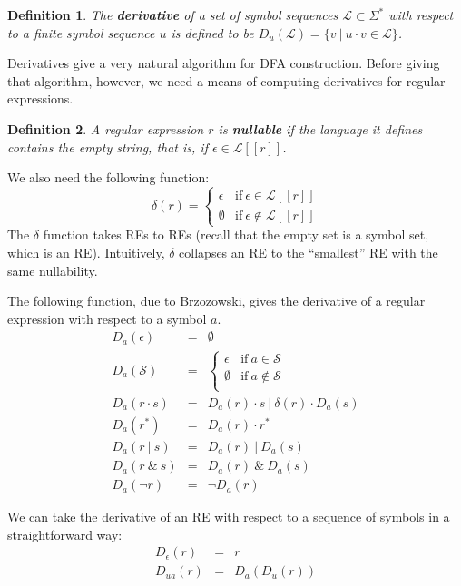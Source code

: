 \documentclass[11pt]{article}
\newcommand{\RE}{r}
\newcommand{\OR}{\ | \ }
\newcommand{\AND}{\ \& \ }
\newcommand{\CL}{\mathcal{L}}
\newcommand{\CS}{\mathcal{S}}
\newcommand{\Sem}[1]{[ \! [ #1 ] \! ]}
\newcommand{\Ls}[1]{\CL\Sem{#1}}
\newcommand{\New}[1]{\emph{\textbf{#1}}}
\newtheorem*{definition}{Definition}
\begin{document}
\begin{definition}  The \New{derivative} of a set of symbol sequences $\CL \subset \Sigma^*$ with respect to a finite symbol sequence $u$ is defined to be $D_u(\CL) = \{ v \ | \ u\cdot v \in \CL \}$.
\end{definition} 

Derivatives give a very natural algorithm for DFA construction.  Before giving that algorithm, however, we need a means of computing derivatives for regular expressions.

\begin{definition} A regular expression $\RE$ is \New{nullable} if the language it defines contains the empty string, that is, if $\epsilon \in \Ls{\RE}$.
\end{definition}

We also need the following function:
\[ \delta(\RE) =
    \begin{cases}
        \epsilon & \textrm{if} \ \epsilon \in \CL\Sem{\RE} \\
        \emptyset & \textrm{if} \ \epsilon \notin \CL\Sem{\RE}
    \end{cases}
\]
The $\delta$ function takes REs to REs (recall that the empty set is a symbol set, which is an RE).  Intuitively, $\delta$ collapses an RE to the ``smallest'' RE with the same nullability.

The following function, due to Brzozowski, gives the derivative of a regular expression with respect to a symbol $a$.  
\begin{eqnarray*}
D_a (\epsilon)  &=& \emptyset \\
D_a (\CS)         &=& 
    \begin{cases}
        \epsilon & \textrm{if} \ a \in \CS \\
        \emptyset & \textrm{if} \ a \notin \CS \\
    \end{cases} \\
D_a (r \cdot s) &=& D_a(r)\cdot s \OR \delta(r) \cdot D_a(s) \\
D_a (r^*)       &=& D_a(r) \cdot r^* \\
D_a (r \OR s)   &=& D_a(r) \OR D_a(s) \\
D_a (r \AND s)  &=& D_a(r) \AND D_a(s) \\
D_a (\neg r)    &=& \neg D_a(r)
\end{eqnarray*}

We can take the derivative of an RE with respect to a sequence of symbols in a straightforward way:
\begin{eqnarray*}
D_\epsilon (r) &=& r \\
D_{ua} (r) &=& D_a(D_u(r))
\end{eqnarray*}
\end{document}
